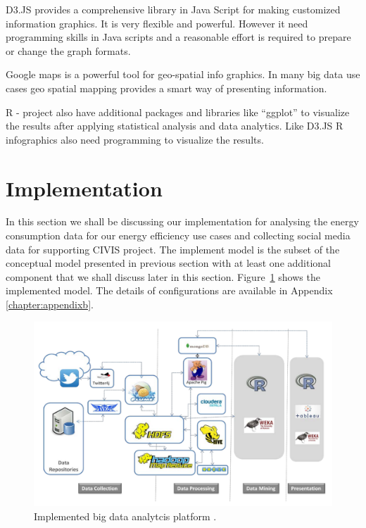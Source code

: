 D3.JS provides a comprehensive library in Java Script for making customized information graphics. It is very flexible and powerful. However it need programming skills in Java scripts and a reasonable effort is required to prepare or change the graph formats. 

Google maps is a powerful tool for geo-spatial info graphics. In many big data use cases geo spatial mapping provides a smart way of presenting information.

R - project also have additional packages and libraries like ``ggplot'' to visualize the results after applying statistical analysis and data analytics. Like D3.JS R infographics also need programming to visualize the results.

\section{Implementation}  
In this section we shall be discussing our implementation for analysing the energy consumption data for our energy efficiency use cases and collecting social media data for supporting CIVIS project. The implement model is the subset of the conceptual model presented in previous section with at least one additional component that we shall discuss later in this section. Figure~\ref{fig:iplatform} shows the implemented model. The details of configurations are available in Appendix \ref{chapter:appendixb}.  
\begin{figure}[!ht]
    \begin{center}
      \includegraphics[width=\textwidth]{images/iplatform.pdf}
      \caption{Implemented big data analytcis platform .}
      \label{fig:iplatform}
    \end{center}
  \end{figure} 
